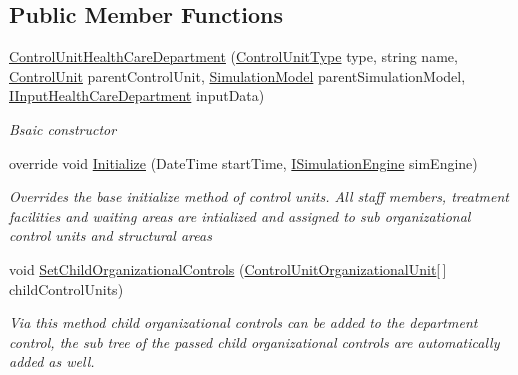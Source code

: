 \subsection*{Public Member Functions}
\begin{DoxyCompactItemize}
\item 
\hyperlink{class_general_health_care_elements_1_1_control_units_1_1_control_unit_health_care_department_aa2457fbc59fe10530c7f81fc653c7f96}{Control\+Unit\+Health\+Care\+Department} (\hyperlink{namespace_enums_aeea01f7c2eb29cb3e9e88daa9732d231}{Control\+Unit\+Type} type, string name, \hyperlink{class_simulation_core_1_1_h_c_c_m_elements_1_1_control_unit}{Control\+Unit} parent\+Control\+Unit, \hyperlink{class_simulation_core_1_1_simulation_classes_1_1_simulation_model}{Simulation\+Model} parent\+Simulation\+Model, \hyperlink{interface_general_health_care_elements_1_1_input_1_1_i_input_health_care_department}{I\+Input\+Health\+Care\+Department} input\+Data)
\begin{DoxyCompactList}\small\item\em Bsaic constructor \end{DoxyCompactList}\item 
override void \hyperlink{class_general_health_care_elements_1_1_control_units_1_1_control_unit_health_care_department_a44dd8b92cd74878a9a237e9050533c94}{Initialize} (Date\+Time start\+Time, \hyperlink{interface_simulation_core_1_1_simulation_classes_1_1_i_simulation_engine}{I\+Simulation\+Engine} sim\+Engine)
\begin{DoxyCompactList}\small\item\em Overrides the base initialize method of control units. All staff members, treatment facilities and waiting areas are intialized and assigned to sub organizational control units and structural areas \end{DoxyCompactList}\item 
void \hyperlink{class_general_health_care_elements_1_1_control_units_1_1_control_unit_health_care_department_a12ea0e9d8cead97628e28ce776890375}{Set\+Child\+Organizational\+Controls} (\hyperlink{class_general_health_care_elements_1_1_control_units_1_1_control_unit_organizational_unit}{Control\+Unit\+Organizational\+Unit}\mbox{[}$\,$\mbox{]} child\+Control\+Units)
\begin{DoxyCompactList}\small\item\em Via this method child organizational controls can be added to the department control, the sub tree of the passed child organizational controls are automatically added as well. \end{DoxyCompactList}\item 

\end{DoxyCompactItemize}
